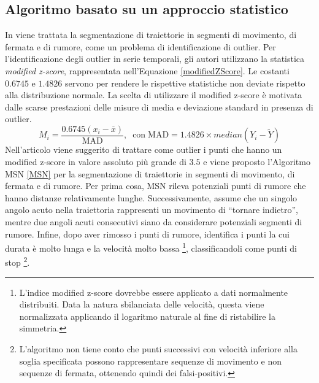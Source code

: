 \documentclass[12pt]{article}
\begin{document}
\subsection{Algoritmo basato su un approccio statistico}
In \cite{SpaceTimeTreshold} viene trattata la segmentazione di traiettorie in segmenti di movimento, di fermata e di rumore, come un problema di identificazione di outlier.
Per l'identificazione degli outlier in serie temporali, gli autori utilizzano la statistica \emph{modified z-score}, rappresentata nell'Equazione \ref{modifiedZScore}.
Le costanti $0.6745$ e $1.4826$ servono per rendere le rispettive statistiche non deviate rispetto alla distribuzione normale.
La scelta di utilizzare il modified z-score è motivata dalle scarse prestazioni delle misure di media e deviazione standard in presenza di outlier.
\begin{equation} \label{modifiedZScore}
    M_i = \frac{0.6745(x_i - \overline{x})}{\mathrm{MAD}},\;\;\mathrm{con}\;\mathrm{MAD} = 1.4826 \times median(Y_i - \widetilde{Y}) 
\end{equation}
Nell'articolo viene suggerito di trattare come outlier i punti che hanno un modified z-score in valore assoluto più grande di $3.5$ e viene proposto l'Algoritmo MSN \ref{MSN} per la segmentazione di traiettorie in segmenti di movimento, di fermata e di rumore.
Per prima cosa, MSN rileva potenziali punti di rumore che hanno distanze relativamente lunghe.
Successivamente, assume che un singolo angolo acuto nella traiettoria rappresenti un movimento di “tornare indietro”, mentre due angoli acuti consecutivi siano da considerare potenziali segmenti di rumore.
Infine, dopo aver rimosso i punti di rumore, identifica i punti la cui durata è molto lunga e la velocità molto bassa \footnote{L'indice modified z-score dovrebbe essere applicato a dati normalmente distribuiti. Data la natura sbilanciata delle velocità, questa viene normalizzata applicando il logaritmo naturale al fine di ristabilire la simmetria.},  classificandoli come punti di stop \footnote{L'algoritmo non tiene conto che punti successivi con velocità inferiore alla soglia specificata possono rappresentare sequenze di movimento e non sequenze di fermata, ottenendo quindi dei falsi-positivi.}.
\end{document}
